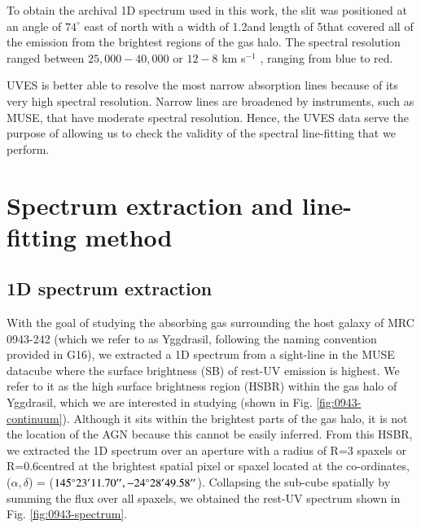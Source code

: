 To obtain the archival 1D spectrum used in this work, the slit was positioned at an angle of $74^\circ$ east of north with a width of 1.2\arcsec and length of 5\arcsec that covered all of the emission from the brightest regions of the gas halo. The spectral resolution ranged between $25,000-40,000$ or $12 - 8$ km s$^{-1}$ , ranging from blue to red. 

UVES is better able to resolve the most narrow absorption lines because of its very high spectral resolution. Narrow lines are broadened by instruments, such as MUSE, that have moderate spectral resolution. Hence, the UVES data serve the purpose of allowing us to check the validity of the spectral line-fitting that we perform. 

\section{Spectrum extraction and line-fitting method}\label{section:line-fitting}
\subsection{1D spectrum extraction}

With the goal of studying the absorbing gas surrounding the host galaxy of MRC 0943-242 (which we refer to as Yggdrasil, following the naming convention provided in G16), we extracted a 1D spectrum from a sight-line in the MUSE datacube where the surface brightness (SB) of rest-UV emission is highest. We refer to it as the high surface brightness region (HSBR) within the gas halo of Yggdrasil, which we are interested in studying (shown in Fig. \ref{fig:0943-continuum}). Although it sits within the brightest parts of the gas halo, it is not the location of the AGN because this cannot be easily inferred. From this HSBR, we extracted the 1D spectrum over an aperture with a radius of R=3 spaxels or R=0.6\arcsec centred at the brightest spatial pixel or spaxel located at the co-ordinates, ($\alpha, \delta$) = ($145^\circ 23^\prime 11.70^{\prime\prime}, -24^\circ 28^\prime 49.58^{\prime\prime}$). Collapsing the sub-cube spatially by summing the flux over all spaxels, we obtained the rest-UV spectrum shown in Fig. \ref{fig:0943-spectrum}. 

